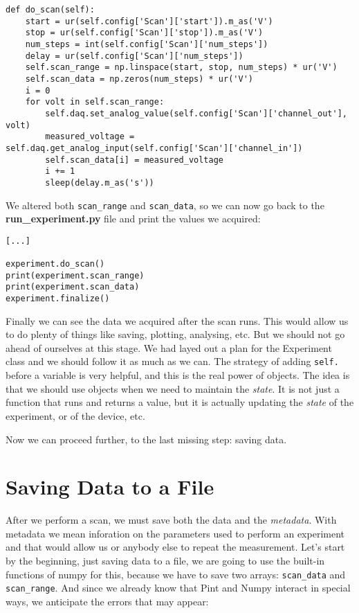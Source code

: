 {{{{\begin{verbatim}
def do_scan(self):
    start = ur(self.config['Scan']['start']).m_as('V')
    stop = ur(self.config['Scan']['stop']).m_as('V')
    num_steps = int(self.config['Scan']['num_steps'])
    delay = ur(self.config['Scan']['num_steps'])
    self.scan_range = np.linspace(start, stop, num_steps) * ur('V')
    self.scan_data = np.zeros(num_steps) * ur('V')
    i = 0
    for volt in self.scan_range:
        self.daq.set_analog_value(self.config['Scan']['channel_out'], volt)
        measured_voltage = self.daq.get_analog_input(self.config['Scan']['channel_in'])
        self.scan_data[i] = measured_voltage
        i += 1
        sleep(delay.m_as('s'))
\end{verbatim}

We altered both \texttt{scan\_range} and \texttt{scan\_data}, so we can now go back to the \textbf{run\_experiment.py} file and print the values we acquired:

\begin{verbatim}
[...]

experiment.do_scan()
print(experiment.scan_range)
print(experiment.scan_data)
experiment.finalize()
\end{verbatim}

Finally we can see the data we acquired after the scan runs. This would allow us to do plenty of things like saving, plotting, analysing, etc. But we should not go ahead of ourselves at this stage. We had layed out a plan for the Experiment class and we should follow it as much as we can. The strategy of adding \texttt{self.} before a variable is very helpful, and this is the real power of objects. The idea is that we should use objects when we need to maintain the \emph{state}. It is not just a function that runs and returns a value, but it is actually updating the \emph{state} of the experiment, or of the device, etc. 

Now we can proceed further, to the last missing step: saving data.

\section{Saving Data to a File}\label{section:saving-data}
After we perform a scan, we must save both the data and the \emph{metadata}. With metadata we mean inforation on the parameters used to perform an experiment and that would allow us or anybody else to repeat the measurement. Let's start by the beginning, just saving data to a file, we are going to use the built-in functions of numpy for this, because we have to save two arrays: \texttt{scan\_data} and \texttt{scan\_range}. And since we already know that Pint and Numpy interact in special ways, we anticipate the errors that may appear:

}}}}
